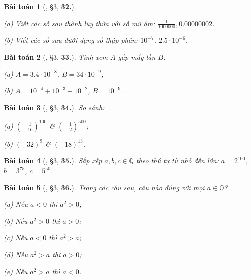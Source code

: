 \documentclass{article}
\numberwithin{equation}{section}
\newtheorem{baitoan}{Bài toán}[section]
\begin{document}
\begin{baitoan}[\cite{Binh_Toan_7_tap_1}, \S3, \textbf{32.}]
	\begin{enumerate*}
		\item[(a)] Viết các số sau thành lũy thừa với số mũ âm: $\frac{1}{1000000},0.00000002$.
		\item[(b)] Viết các số sau dưới dạng số thập phân: $10^{-7}$, $2.5\cdot 10^{-6}$.
	\end{enumerate*}
\end{baitoan}

\begin{baitoan}[\cite{Binh_Toan_7_tap_1}, \S3, \textbf{33.}]
	Tính xem $A$ gấp mấy lần $B$:
	\begin{enumerate*}
		\item[(a)] $A = 3.4\cdot 10^{-8}$, $B = 34\cdot 10^{-9}$;
		\item[(b)] $A = 10^{-4} + 10^{-3} + 10^{-2}$, $B = 10^{-9}$.
	\end{enumerate*}
\end{baitoan}

\begin{baitoan}[\cite{Binh_Toan_7_tap_1}, \S3, \textbf{34.}]
	So sánh:
	\begin{enumerate*}
		\item[(a)] $\left(-\frac{1}{16}\right)^{100}$ \& $\left(-\frac{1}{2}\right)^{500}$;
		\item[(b)] $(-32)^9$ \& $(-18)^{13}$.
	\end{enumerate*}
\end{baitoan}

\begin{baitoan}[\cite{Binh_Toan_7_tap_1}, \S3, \textbf{35.}]
	Sắp xếp $a,b,c\in\mathbb{Q}$ theo thứ tự từ nhỏ đến lớn: $a = 2^{100}$, $b = 3^{75}$, $c = 5^{50}$.
\end{baitoan}

\begin{baitoan}[\cite{Binh_Toan_7_tap_1}, \S3, \textbf{36.}]
	Trong các câu sau, câu nào đúng với mọi $a\in\mathbb{Q}$?
	\begin{enumerate*}
		\item[(a)] Nếu $a < 0$ thì $a^2 > 0$;
		\item[(b)] Nếu $a^2 > 0$ thì $a > 0$;
		\item[(c)] Nếu $a < 0$ thì $a^2 > a$;
		\item[(d)] Nếu $a^2 > a$ thì $a > 0$;
		\item[(e)] Nếu $a^2 > a$ thì $a < 0$.
	\end{enumerate*}
\end{baitoan}
\end{document}
